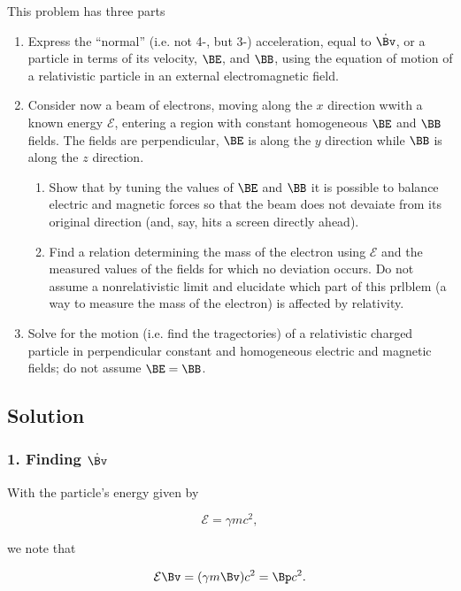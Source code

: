 This problem has three parts
\begin{enumerate}
\item Express the ``normal'' (i.e. not 4-, but 3-) acceleration, equal to $\dot{\Bv}$, or a particle in terms of its velocity, $\BE$, and $\BB$, using the equation of motion of a relativistic particle in an external electromagnetic field.
\item Consider now a beam of electrons, moving along the $x$ direction wwith a known energy $\mathcal{E}$, entering a region with constant homogeneous $\BE$ and $\BB$ fields.  The fields are perpendicular, $\BE$ is along the $y$ direction while $\BB$ is along the $z$ direction.
\begin{enumerate}
\item
Show that by tuning the values of $\BE$ and $\BB$ it is possible to balance electric and magnetic forces so that the beam does not devaiate from its original direction (and, say, hits a screen directly ahead).
\item Find a relation determining the mass of the electron using $\mathcal{E}$ and the measured values of the fields for which no deviation occurs.  Do not assume a nonrelativistic limit and elucidate which part of this prlblem (a way to measure the mass of the electron) is affected by relativity.
\end{enumerate}
\item Solve for the motion (i.e. find the tragectories) of a relativistic charged particle in perpendicular constant and homogeneous electric and magnetic fields; do not assume $\BE = \BB$.
\end{enumerate}
\subsection{Solution}
\subsubsection{1. Finding $\dot{\Bv}$}

With the particle's energy given by

\begin{equation}\label{eqn:relElectroDynProblemSet2:150}
\mathcal{E} = \gamma m c^2,
\end{equation}

we note that

\begin{equation}\label{eqn:relElectroDynProblemSet2:170}
\mathcal{E}\Bv = (\gamma m \Bv) c^2 = \Bp c^2.
\end{equation}

